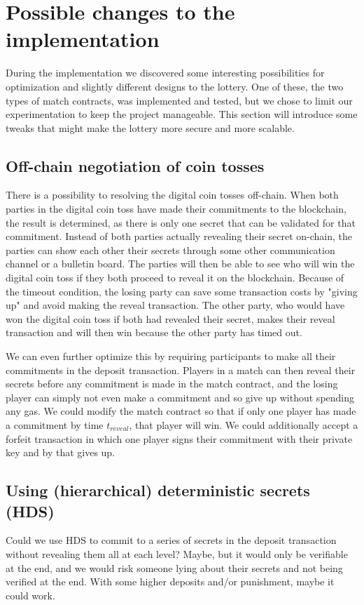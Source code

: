 \section{Possible changes to the implementation}
\label{sec:optimizations}

During the implementation we discovered some interesting possibilities for optimization and slightly different designs to the lottery. One of these, the two types of match contracts, was implemented and tested, but we chose to limit our experimentation to keep the project manageable. This section will introduce some tweaks that might make the lottery more secure and more scalable.

\subsection{Off-chain negotiation of coin tosses}
There is a possibility to resolving the digital coin tosses off-chain. When both parties in the digital coin toss have made their commitments to the blockchain, the result is determined, as there is only one secret that can be validated for that commitment. Instead of both parties actually revealing their secret on-chain, the parties can show each other their secrets through some other communication channel or a bulletin board. The parties will then be able to see who will win the digital coin toss if they both proceed to reveal it on the blockchain. Because of the timeout condition, the losing party can save some transaction costs by "giving up" and avoid making the reveal transaction. The other party, who would have won the digital coin toss if both had revealed their secret, makes their reveal transaction and will then win because the other party has timed out.

We can even further optimize this by requiring participants to make all their commitments in the deposit transaction. Players in a match can then reveal their secrets before any commitment is made in the match contract, and the losing player can simply not even make a commitment and so give up without spending any gas. We could modify the match contract so that if only one player has made a commitment by time $t_{reveal}$, that player will win. We could additionally accept a forfeit transaction in which one player signs their commitment with their private key and by that gives up.

\subsection{Using (hierarchical) deterministic secrets (HDS)}
Could we use HDS to commit to a series of secrets in the deposit transaction without revealing them all at each level? Maybe, but it would only be verifiable at the end, and we would risk someone lying about their secrets and not being verified at the end. With some higher deposits and/or punishment, maybe it could work.

